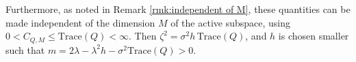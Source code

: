 \documentclass[12pt]{amsart}
\DeclareMathOperator*{\essinf}{ess-inf}
\numberwithin{equation}{section}
\newtheorem{theorem}{Theorem}[section]
\begin{document}
Furthermore, as noted in Remark \ref{rmk:independent of M}, these quantities can be made independent of the dimension $M$ of the active subspace, using  $0< C_{Q,M}\leq \mathrm{Trace}(Q)<\infty$. Then $\zeta^2 = \sigma^2 h\, \mathrm{Trace}(Q)$, and $h$ is chosen smaller such that $m = 2\lambda - \lambda^2 h - \sigma^2 \mathrm{Trace}(Q) > 0$.



\end{document}
